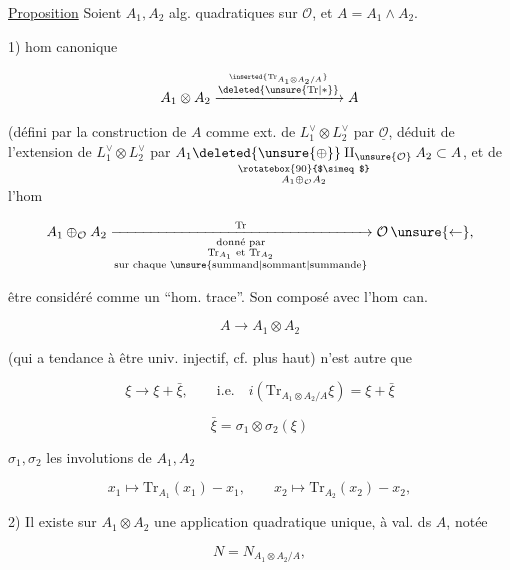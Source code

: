 
\uline{Proposition} Soient $A_1,A_2$  alg. quadratiques sur $\mathcal O$, et $A=A_1\wedge A_2$. 

1)  hom canonique

\[
A_1\otimes A_2\xrightarrow{\overset{\inserted{\mathrm{Tr}_{A_1\otimes A_2/A}}}{\deleted{\unsure{\mathrm{Tr}|*}}}}A
\]

(défini par la construction de $A$ comme ext. de $L_1^\vee\otimes L_2^\vee$ par $\underline{\mathcal O}$, déduit de l'extension  de $L_1^\vee\otimes L_2^\vee$ par
$\underset{\substack{\rotatebox{90}{$\simeq$}\\ A_1\oplus_{\mathcal O}A_2}}{A_1\deleted{\unsure{\oplus}}\amalg_{\unsure{\mathcal O}}A_2}\subset A$, et de l'hom

\[
A_1\oplus_{\mathcal O}A_2
\xrightarrow[\substack{\text{donné par}\\\mathrm{Tr}_{A_1}\text{ et }\mathrm{Tr}_{A_2}\\\text{sur chaque \unsure{summand|sommant|summande}}}]{\mathrm{Tr}}\mathcal O\,\unsure{\leftarrow},
\]


être considéré comme un ``hom. trace''. Son composé avec l'hom can.

\[
A\longrightarrow A_1\otimes A_2
\]

(qui a tendance à être univ. injectif, cf. plus haut)  n'est autre que


\[
\xi\longrightarrow\xi+\bar\xi,\qquad\text{i.e.}\quad
\boxed{i(\mathrm{Tr}_{A_1\otimes A_2/A}\xi)=\xi+\bar\xi}
\]

\[
\bar\xi=\sigma_1\otimes\sigma_2(\xi)
\]

$\sigma_1,\sigma_2$ les involutions  de $A_1,A_2$

\[
x_1\longmapsto\mathrm{Tr}_{A_1}(x_1)-x_1,\qquad x_2\longmapsto\mathrm{Tr}_{A_2}(x_2)-x_2,
\]

2) Il existe sur $A_1\otimes A_2$ une application quadratique unique, à val. ds $A$, notée

\[
N=N_{A_1\otimes A_2/A},
\]


